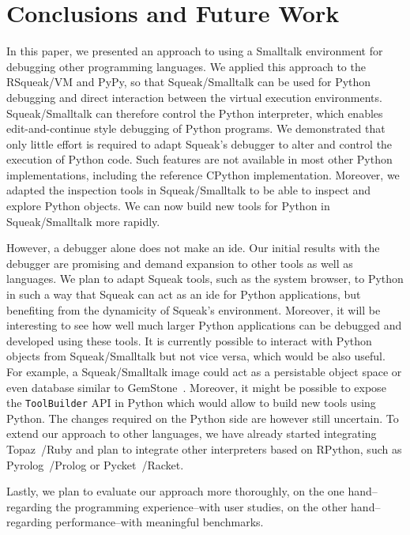 \documentclass[sigconf,english]{acmart}
\newcommand{\ac}[1]{\gls*{#1}}
\newcommand*\Squeak{Squeak\slash Smalltalk\xspace}
\begin{document}
\section{Conclusions and Future Work}
\label{sec:concl-future-work}

In this paper, we presented an approach to using a Smalltalk environment for
debugging other programming languages. We applied this approach to the
RSqueak/VM and PyPy, so that \Squeak can be used for Python debugging and
direct interaction between the virtual execution environments. \Squeak can
therefore control the Python interpreter, which enables edit-and-continue
style debugging of Python programs. We demonstrated that only little effort is
required to adapt Squeak's debugger to alter and control the execution of
Python code. Such features are not available in most other Python
implementations, including the reference CPython implementation.
Moreover, we adapted the inspection tools in \Squeak to be able to inspect and
explore Python objects.
We can now build new tools for Python in \Squeak more rapidly.

However, a debugger alone does not make an \ac{ide}. Our initial results with
the debugger are promising and demand expansion to other tools as well as
languages. We plan to adapt Squeak tools, such as the system browser, to Python
in such a way that Squeak can act as an \ac{ide} for Python applications, but
benefiting from the dynamicity of Squeak's environment.
Moreover, it will be interesting to see how well much larger Python
applications can be debugged and developed using these tools. It is currently
possible to interact with Python objects from \Squeak but not vice versa, which would
be also useful. For example, a \Squeak image could act as a persistable object
space or even database similar to GemStone~\cite{butterworth1991gemstone}.
Moreover, it might be possible to expose the \lstinline{ToolBuilder} API in
Python which would allow to build new tools using Python.
The changes required on the Python side are however still uncertain.
To extend our approach to other languages, we have already started integrating
Topaz~\cite{FelgentreffTopazWroclove2013}\slash Ruby and plan to integrate
other interpreters based on RPython, such as
Pyrolog~\cite{barrett2013unipycation}\slash Prolog or
Pycket~\cite{bauman2015pycket}\slash Racket.

Lastly, we plan to evaluate our approach more thoroughly, on the one
hand\---regarding the programming experience\---with user studies, on the other
hand\---regarding performance\---with meaningful benchmarks.
\end{document}
